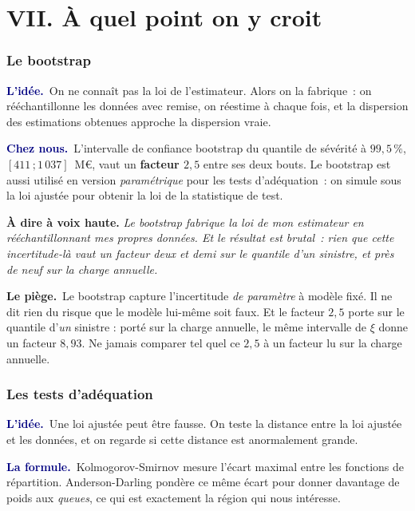 \documentclass[11pt,a4paper]{article}
\newcommand{\lidee}[1]{\smallskip\noindent\textcolor{navy}{\textbf{L'idée.}}\ #1\par}
\newcommand{\laformule}[1]{\smallskip\noindent\textcolor{navy}{\textbf{La formule.}}\ #1\par}
\newcommand{\cheznous}[1]{\smallskip\noindent\textcolor{navy}{\textbf{Chez nous.}}\ #1\par}
\newcommand{\lepiege}[1]{\smallskip\noindent\textcolor{accent}{\textbf{Le piège.}}\ #1\par}
\newcommand{\laphrase}[1]{\begin{phrasebox}\textbf{À dire à voix haute.} \emph{#1}\end{phrasebox}}
\begin{document}
\part*{VII. À quel point on y croit}

\section{Le bootstrap}

\lidee{On ne connaît pas la loi de l'estimateur. Alors on la fabrique~: on rééchantillonne
les données avec remise, on réestime à chaque fois, et la dispersion des estimations
obtenues approche la dispersion vraie.}

\cheznous{L'intervalle de confiance bootstrap du quantile de sévérité à $99{,}5\,\%$,
$[411\,;1\,037]$~M\euro, vaut un \textbf{facteur $2{,}5$} entre ses deux bouts. Le bootstrap est
aussi utilisé en version
\emph{paramétrique} pour les tests d'adéquation~: on simule sous la loi ajustée pour obtenir
la loi de la statistique de test.}

\laphrase{Le bootstrap fabrique la loi de mon estimateur en rééchantillonnant mes propres
données. Et le résultat est brutal~: rien que cette incertitude-là vaut un facteur deux et
demi sur le quantile d'un sinistre, et près de neuf sur la charge annuelle.}

\lepiege{Le bootstrap capture l'incertitude \emph{de paramètre} à modèle fixé. Il ne dit rien du
risque que le modèle lui-même soit faux. Et le facteur $2{,}5$ porte sur le quantile d'\emph{un}
sinistre : porté sur la charge annuelle, le même intervalle de $\xi$ donne un facteur $8{,}93$. Ne
jamais comparer tel quel ce $2{,}5$ à un facteur lu sur la charge annuelle.}

\section{Les tests d'adéquation}

\lidee{Une loi ajustée peut être fausse. On teste la distance entre la loi ajustée et les
données, et on regarde si cette distance est anormalement grande.}

\laformule{Kolmogorov-Smirnov mesure l'écart maximal entre les fonctions de répartition.
Anderson-Darling pondère ce même écart pour donner davantage de poids aux \emph{queues}, ce
qui est exactement la région qui nous intéresse.}
\end{document}
